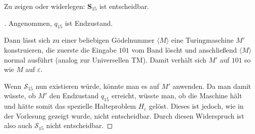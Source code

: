 Zu zeigen oder widerlegen: $\mathbf{S}_{15}$ ist entscheidbar.

\begin{proof}[\unskip\nopunct]
	Angenommen, $q_{15}$ ist Endzustand.

	Dann lässt sich zu einer beliebigen Gödelnummer $\langle M \rangle$ eine
	Turingmaschine $M'$ konstruieren, die zuerste die Eingabe $101$ vom Band
	löscht und anschließend $\langle M \rangle$ normal ausführt (analog zur
	Universellen TM). Damit verhält sich $M'$ auf $101$ so wie $M$ auf
	$\varepsilon$.

	Wenn $\mathcal{S}_{15}$ nun existieren würde, könnte man es auf $M'$
	anwenden. Da man damit wüsste, ob $M'$ den Endzustand $q_{15}$ erreicht,
	wüsste man, ob die Maschine hält und hätte somit das spezielle Halteproblem
	$H_\varepsilon$ gelöst. Dieses ist jedoch, wie in der Vorlesung gezeigt
	wurde, nicht entscheidbar. Durch diesen Widerspruch ist also auch
	$\mathcal{S}_{15}$ nicht entscheidbar.
\end{proof}
